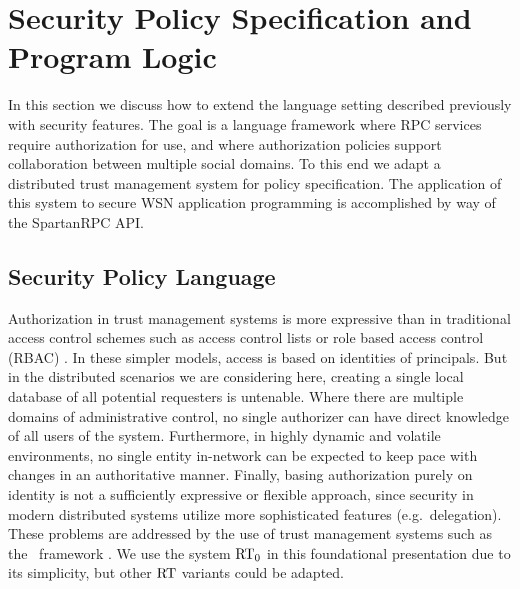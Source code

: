 %

\section{Security Policy Specification and Program Logic}
\label{section-security-extensions}

In this section we discuss how to extend the language setting
described previously with security features. The goal is a language
framework where RPC services require authorization for use, and where
authorization policies support collaboration between multiple social
domains. To this end we adapt a distributed trust management system
\cite{chapin-skalka-wang-acmcs08} for policy specification. The
application of this system to secure WSN application programming is
accomplished by way of the SpartanRPC API.

\subsection{Security Policy Language} Authorization in trust
management systems is more expressive than in traditional access
control schemes such as access control lists or role based access
control (RBAC) \cite{Sandhu:RBACM}. In these simpler models, access is
based on identities of principals. But in the distributed scenarios we
are considering here, creating a single local database of all
potential requesters is untenable. Where there are multiple domains of
administrative control, no single authorizer can have direct knowledge
of all users of the system. Furthermore, in highly dynamic and
volatile environments, no single entity in-network can be expected to
keep pace with changes in an authoritative manner. Finally, basing
authorization purely on identity is not a sufficiently expressive or
flexible approach, since security in modern distributed systems
utilize more sophisticated features (e.g.~delegation). These problems
are addressed by the use of trust management systems such as the
\RT\ framework \cite{Li:DRBTMF}. We use the system $\text{RT}_0$ in this
foundational presentation due to its simplicity, but other $\text{RT}$
variants \cite{Li:DCDTM,Li:RRBTMF} could be adapted.

